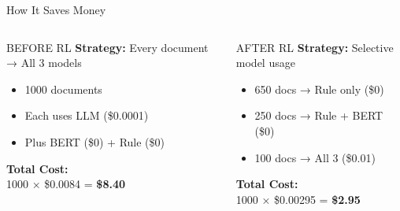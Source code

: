 \documentclass[aspectratio=169]{beamer}
\begin{document}
\begin{frame}{How It Saves Money \faDollarSign}
\begin{columns}[T]
\begin{alertblock}{BEFORE RL}
\textbf{Strategy:} Every document → All 3 models

\vspace{0.3cm}

\begin{itemize}
    \item 1000 documents
    \item Each uses LLM (\$0.0001)
    \item Plus BERT (\$0) + Rule (\$0)
\end{itemize}

\vspace{0.3cm}

\textbf{Total Cost:} \\
1000 × \$0.0084 = \textcolor{errorred}{\textbf{\$8.40}}
\end{alertblock}

\begin{exampleblock}{AFTER RL}
\textbf{Strategy:} Selective model usage

\vspace{0.3cm}

\begin{itemize}
    \item 650 docs → Rule only (\$0)
    \item 250 docs → Rule + BERT (\$0)
    \item 100 docs → All 3 (\$0.01)
\end{itemize}

\vspace{0.3cm}

\textbf{Total Cost:} \\
1000 × \$0.00295 = \textcolor{successgreen}{\textbf{\$2.95}}
\end{exampleblock}
\end{columns}

\vspace{0.5cm}

\begin{center}
\end{center}
\end{frame}
\end{document}
